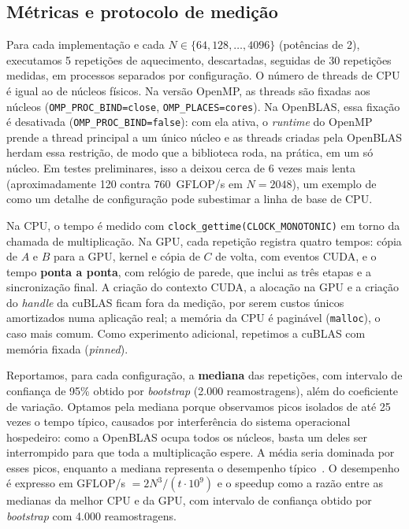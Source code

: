 \documentclass[12pt]{article}
\newcommand{\nMax}{4096}
\begin{document}
\subsection{Métricas e protocolo de medição}

Para cada implementação e cada $N \in \{64, 128, \dots, \nMax\}$ (potências de
2), executamos 5 repetições de aquecimento, descartadas, seguidas de 30
repetições medidas, em processos separados por configuração. O número de
threads de CPU é igual ao de núcleos físicos. Na versão OpenMP, as threads são
fixadas aos núcleos (\texttt{OMP\_PROC\_BIND=close},
\texttt{OMP\_PLACES=cores}). Na OpenBLAS, essa fixação é desativada
(\texttt{OMP\_PROC\_BIND=false}): com ela ativa, o \emph{runtime} do OpenMP
prende a thread principal a um único núcleo e as threads criadas pela OpenBLAS
herdam essa restrição, de modo que a biblioteca roda, na prática, em um só
núcleo. Em testes preliminares, isso a deixou cerca de 6 vezes mais lenta
(aproximadamente 120 contra 760~GFLOP/s em $N=2048$), um exemplo de como um
detalhe de configuração pode subestimar a linha de base de CPU.

Na CPU, o tempo é medido com \texttt{clock\_gettime(CLOCK\_MONOTONIC)} em
torno da chamada de multiplicação. Na GPU, cada repetição registra quatro
tempos: cópia de $A$ e $B$ para a GPU, kernel e cópia de $C$ de volta, com
eventos CUDA, e o tempo \textbf{ponta a ponta}, com relógio de parede, que
inclui as três etapas e a sincronização final. A criação do contexto CUDA, a
alocação na GPU e a criação do \emph{handle} da cuBLAS ficam fora da medição,
por serem custos únicos amortizados numa aplicação real; a memória da CPU é
paginável (\texttt{malloc}), o caso mais comum. Como experimento adicional,
repetimos a cuBLAS com memória fixada (\emph{pinned}).

Reportamos, para cada configuração, a \textbf{mediana} das repetições, com
intervalo de confiança de 95\% obtido por \emph{bootstrap} (2.000
reamostragens), além do coeficiente de variação. Optamos pela mediana porque
observamos picos isolados de até 25 vezes o tempo típico, causados por
interferência do sistema operacional hospedeiro: como a OpenBLAS ocupa todos os
núcleos, basta um deles ser interrompido para que toda a multiplicação espere.
A média seria dominada por esses picos, enquanto a mediana representa o
desempenho típico~\cite{jain1991}. O desempenho é expresso em GFLOP/s
$= 2N^3/(t \cdot 10^9)$ e o speedup como a razão entre as medianas da melhor
CPU e da GPU, com intervalo de confiança obtido por \emph{bootstrap} com 4.000
reamostragens.
\end{document}
